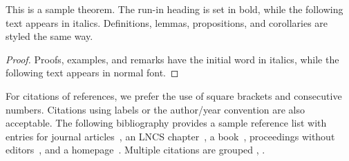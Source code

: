 \documentclass[runningheads]{llncs}
\begin{document}
\begin{theorem}
This is a sample theorem. The run-in heading is set in bold, while
the following text appears in italics. Definitions, lemmas,
propositions, and corollaries are styled the same way.
\end{theorem}
%
%
\begin{proof}
Proofs, examples, and remarks have the initial word in italics,
while the following text appears in normal font.
\end{proof}
For citations of references, we prefer the use of square brackets
and consecutive numbers. Citations using labels or the author/year
convention are also acceptable. The following bibliography provides
a sample reference list with entries for journal
articles~\cite{ref_article1}, an LNCS chapter~\cite{ref_lncs1}, a
book~\cite{ref_book1}, proceedings without editors~\cite{ref_proc1},
and a homepage~\cite{ref_url1}. Multiple citations are grouped
\cite{ref_article1,ref_lncs1,ref_book1},
\cite{ref_article1,ref_book1,ref_proc1,ref_url1}.
\end{document}
